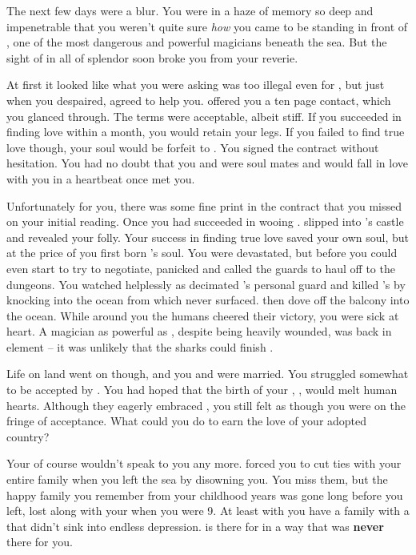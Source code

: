 \documentclass[char]{NeptuneBall}
\begin{document}
The next few days were a blur. You were in a haze of memory so deep and impenetrable that you weren't quite sure \emph{how} you came to be standing in front of \cWitch{}, one of the most dangerous and powerful magicians beneath the sea. But the sight of \cWitch{\them} in all of \cWitch{\their} splendor soon broke you from your reverie.

At first it looked like what you were asking was too illegal even for \cWitch{}, but just when you despaired, \cWitch{\they} agreed to help you. \cWitch{} offered you a ten page contact, which you glanced through. The terms were acceptable, albeit stiff. If you succeeded in finding love within a month, you would retain your legs. If you failed to find true love though, your soul would be forfeit to \cWitch{}. You signed the contract without hesitation. You had no doubt that you and \cEric{} were soul mates and \cEric{\they} would fall in love with you in a heartbeat once \cEric{} met you.

Unfortunately for you, there was some fine print in the contract that you missed on your initial reading. Once you had succeeded in wooing \cEric{}. \cWitch{} slipped into \cEric{}'s castle and revealed your folly. Your success in finding true love saved your own soul, but at the price of you first born \cArielsSon{\offspring}'s soul. You were devastated, but before you could even start to try to negotiate, \cEric{} panicked and called the guards to haul \cWitch{} off to the dungeons. You watched helplessly as \cWitch{} decimated \cEric{}'s personal guard and killed \cEric{}'s \cPrince{\sibling} \cSlave{} by knocking \cSlave{\them} into the ocean from which \cSlave{\they} never surfaced. \cWitch{} then dove off the balcony into the ocean. While around you the humans cheered their victory, you were sick at heart. A magician as powerful as \cWitch{}, despite being heavily wounded, was back in \cWitch{\them} element -- it was unlikely that the sharks could finish \cWitch{\them}.

Life on land went on though, and you and \cEric{} were married. You struggled somewhat to be accepted by \pAmerica{}. You had hoped that the birth of your \cWillow{\offspring}, \cWillow{}, would melt human hearts. Although they eagerly embraced \cWillow{}, you still felt as though you were on the fringe of acceptance. What could you do to earn the love of your adopted country? 

Your \cKing{\parent} of course wouldn't speak to you any more. \cKing{\They} forced you to cut ties with your entire family when you left the sea by disowning you. You miss them, but the happy family you remember from your childhood years was gone long before you left, lost along with your \cAthena{\parent} when you were 9. At least with \cEric{} you have a family with a \cEric{\parent} that didn't sink into endless depression. \cEric{} is there for \cWillow{} in a way that \cKing{} was {\bf never} there for you.
\end{document}
